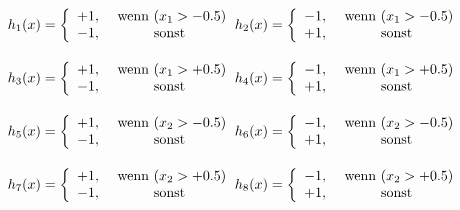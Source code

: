 \begin{align*}
    h_1(x)=\left\{\begin{array}{r c}
                      +1, & \text{ wenn } (x_1 > -0.5) \\
                      -1, & \text{sonst}
                  \end{array}\right. &
    h_2(x)=\left\{\begin{array}{r c}
                      -1, & \text{ wenn } (x_1 > -0.5) \\
                      +1, & \text{sonst}
                  \end{array}\right. \\[10pt]
    h_3(x)=\left\{\begin{array}{r c}
                      +1, & \text{ wenn } (x_1 > +0.5) \\
                      -1, & \text{sonst}
                  \end{array}\right. &
    h_4(x)=\left\{\begin{array}{r c}
                      -1, & \text{ wenn } (x_1 > +0.5) \\
                      +1, & \text{sonst}
                  \end{array}\right. \\[10pt]
    h_5(x)=\left\{\begin{array}{r c}
                      +1, & \text{ wenn } (x_2 > -0.5) \\
                      -1, & \text{sonst}
                  \end{array}\right. &
    h_6(x)=\left\{\begin{array}{r c}
                      -1, & \text{ wenn } (x_2 > -0.5) \\
                      +1, & \text{sonst}
                  \end{array}\right. \\[10pt]
    h_7(x)=\left\{\begin{array}{r c}
                      +1, & \text{ wenn } (x_2 > +0.5) \\
                      -1, & \text{sonst}
                  \end{array}\right. &
    h_8(x)=\left\{\begin{array}{r c}
                      -1, & \text{ wenn } (x_2 > +0.5) \\
                      +1, & \text{sonst}
                  \end{array}\right. \\[10pt]
\end{align*}